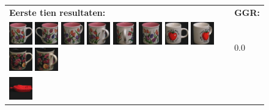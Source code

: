 \begin{figure}[tbp]
\begin{center}
\begin{tabular}{m{11cm} | m{3cm} |}
\textbf{Eerste tien resultaten:} & \textbf{GGR:} \\
\vspace{4pt}
\includegraphics[width=1cm]{coil/beeld-6.eps}
\includegraphics[width=1cm]{coil/beeld-7.eps}
\includegraphics[width=1cm]{coil/beeld-9.eps}
\includegraphics[width=1cm]{coil/beeld-10.eps}
\includegraphics[width=1cm]{coil/beeld-11.eps}
\includegraphics[width=1cm]{coil/beeld-8.eps}
\includegraphics[width=1cm]{coil/beeld-36.eps}
\includegraphics[width=1cm]{coil/beeld-39.eps}
\includegraphics[width=1cm]{coil/beeld-60.eps}
\includegraphics[width=1cm]{coil/beeld-64.eps}
& {\scriptsize 0.0}
\\
\includegraphics[width=1cm]{coil/beeld-18.eps}

\end{tabular}
\end{center}
\end{figure}
